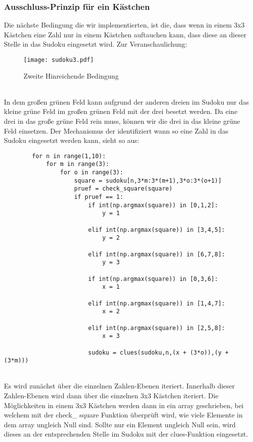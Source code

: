 \documentclass[11pt,a4paper]{article}
\begin{document}
\subsubsection{Ausschluss-Prinzip für ein Kästchen}
Die nächste Bedingung die wir implementierten, ist die, dass wenn in einem 3x3 Kästchen eine Zahl nur in einem Kästchen auftauchen kann, dass diese an dieser Stelle in das Sudoku eingesetzt wird. Zur Veranschaulichung: 
\ \\
\begin{figure}[htbp!]
\begin{center}
\texttt{[image: sudoku3.pdf]}
\end{center}
\caption{Zweite Hinreichende Bedingung}
\end{figure}
\ \\ 
In dem großen grünen Feld kann aufgrund der anderen dreien im Sudoku nur das kleine grüne Feld im großen grünen Feld mit der drei besetzt werden. Da eine drei in das große grüne Feld rein muss, können wir die drei in das kleine grüne Feld einsetzen. Der Mechanismus der identifiziert wann so eine Zahl in das Sudoku eingesetzt werden kann, sieht so aus:
\ \\
\begin{verbatim}
        for n in range(1,10):
            for m in range(3):       
                for o in range(3):   
                    square = sudoku[n,3*m:3*(m+1),3*o:3*(o+1)]    
                    pruef = check_square(square)                  
                    if pruef == 1:                           
                        if int(np.argmax(square)) in [0,1,2]:
                            y = 1
                        
                        elif int(np.argmax(square)) in [3,4,5]:
                            y = 2
                        
                        elif int(np.argmax(square)) in [6,7,8]:
                            y = 3
                    
                        if int(np.argmax(square)) in [0,3,6]:
                            x = 1
                        
                        elif int(np.argmax(square)) in [1,4,7]:
                            x = 2
                    
                        elif int(np.argmax(square)) in [2,5,8]:
                            x = 3
                        
                        sudoku = clues(sudoku,n,(x + (3*o)),(y + (3*m)))                        
\end{verbatim}
\ \\
Es wird zunächst über die einzelnen Zahlen-Ebenen iteriert. Innerhalb dieser Zahlen-Ebenen wird dann über die einzelnen 3x3 Kästchen iteriert. Die Möglichkeiten in einem 3x3 Kästchen werden dann in ein array geschrieben, bei welchem mit der check\_ square Funktion überprüft wird, wie viele Elemente in dem array ungleich Null sind.
Sollte nur ein Element ungleich Null sein, wird dieses an der entsprechenden Stelle im Sudoku mit der clues-Funktion eingesetzt.\\
\ \\
\end{document}

